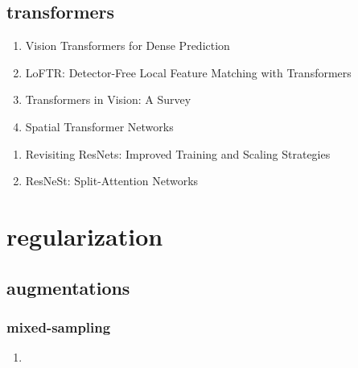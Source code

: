\documentclass[acmlarge]{acmart}
\begin{document}
	\subsection{transformers}
	\begin{enumerate}
		\item Vision Transformers for Dense Prediction \cite{Ranftl2021VisionTF} 

		\item LoFTR: Detector-Free Local Feature Matching with Transformers \cite{Sun2021LoFTRDL} 

		\item Transformers in Vision: A Survey \cite{Khan2022TransformersIV} 

		\item Spatial Transformer Networks \cite{Jaderberg2015SpatialTN} 

	\end{enumerate}
\begin{enumerate}
	\item Revisiting ResNets: Improved Training and Scaling Strategies \cite{Bello2021RevisitingRI} 

	\item ResNeSt: Split-Attention Networks \cite{Zhang2020ResNeStSN} 

\end{enumerate}
\section{regularization}
	\subsection{augmentations}
		\subsubsection{mixed-sampling}
		\begin{enumerate}
			\item
		\end{enumerate}
\end{document}
